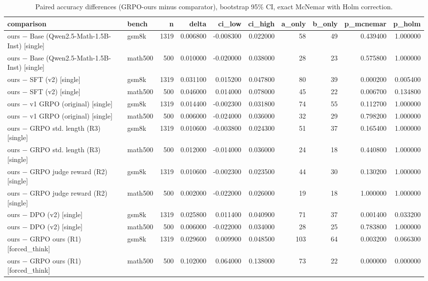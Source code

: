 \begin{table}
\caption{Paired accuracy differences (GRPO-ours minus comparator), bootstrap 95\% CI, exact McNemar with Holm correction.}
\label{tab:paired}
\begin{tabular}{llrrrrrrrr}
\toprule
comparison & bench & n & delta & ci_low & ci_high & a_only & b_only & p_mcnemar & p_holm \\
\midrule
ours − Base (Qwen2.5-Math-1.5B-Inst) [single] & gsm8k & 1319 & 0.006800 & -0.008300 & 0.022000 & 58 & 49 & 0.439400 & 1.000000 \\
ours − Base (Qwen2.5-Math-1.5B-Inst) [single] & math500 & 500 & 0.010000 & -0.020000 & 0.038000 & 28 & 23 & 0.575800 & 1.000000 \\
ours − SFT (v2) [single] & gsm8k & 1319 & 0.031100 & 0.015200 & 0.047800 & 80 & 39 & 0.000200 & 0.005400 \\
ours − SFT (v2) [single] & math500 & 500 & 0.046000 & 0.014000 & 0.078000 & 45 & 22 & 0.006700 & 0.134800 \\
ours − v1 GRPO (original) [single] & gsm8k & 1319 & 0.014400 & -0.002300 & 0.031800 & 74 & 55 & 0.112700 & 1.000000 \\
ours − v1 GRPO (original) [single] & math500 & 500 & 0.006000 & -0.024000 & 0.036000 & 32 & 29 & 0.798200 & 1.000000 \\
ours − GRPO std. length (R3) [single] & gsm8k & 1319 & 0.010600 & -0.003800 & 0.024300 & 51 & 37 & 0.165400 & 1.000000 \\
ours − GRPO std. length (R3) [single] & math500 & 500 & 0.012000 & -0.014000 & 0.036000 & 24 & 18 & 0.440800 & 1.000000 \\
ours − GRPO judge reward (R2) [single] & gsm8k & 1319 & 0.010600 & -0.002300 & 0.023500 & 44 & 30 & 0.130200 & 1.000000 \\
ours − GRPO judge reward (R2) [single] & math500 & 500 & 0.002000 & -0.022000 & 0.026000 & 19 & 18 & 1.000000 & 1.000000 \\
ours − DPO (v2) [single] & gsm8k & 1319 & 0.025800 & 0.011400 & 0.040900 & 71 & 37 & 0.001400 & 0.033200 \\
ours − DPO (v2) [single] & math500 & 500 & 0.006000 & -0.022000 & 0.034000 & 28 & 25 & 0.783800 & 1.000000 \\
ours − GRPO ours (R1) [forced_think] & gsm8k & 1319 & 0.029600 & 0.009900 & 0.048500 & 103 & 64 & 0.003200 & 0.066300 \\
ours − GRPO ours (R1) [forced_think] & math500 & 500 & 0.102000 & 0.064000 & 0.138000 & 73 & 22 & 0.000000 & 0.000000 \\

\end{tabular}
\end{table}

